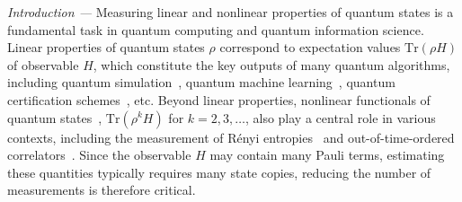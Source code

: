 \documentclass[prl,aps,twocolumn,notitlepage,superscriptaddress,showpacs,nofootinbib]{revtex4-2}
\begin{document}
\emph{Introduction ---}
Measuring linear and nonlinear properties of quantum states is a fundamental task in quantum computing and quantum information science. Linear properties of quantum states $\rho$ correspond to expectation values $\mathrm{Tr}(\rho H)$ of observable $H$, which constitute the key outputs of many quantum algorithms, including quantum simulation~\cite{lloyd1996universal,endo2020variational}, quantum machine learning~\cite{Schuld2015IntroQML, Biamonte2017QuantumML, schuld2019quantum}, quantum certification schemes~\cite{eisert2020quantum}, etc.
Beyond linear properties, {nonlinear} functionals of quantum states~\cite{ekert2002direct}, $\mathrm{Tr}(\rho^k H)$ for $k=2,3,\dots$, also play a central role in various contexts, including the measurement of R\'enyi entropies~\cite{islam2015measuring} and out-of-time-ordered correlators~\cite{swingle2016measuring}. 
Since the observable $H$ may contain many Pauli terms, estimating these quantities typically requires many state copies, reducing the number of measurements is therefore critical.









\end{document}
